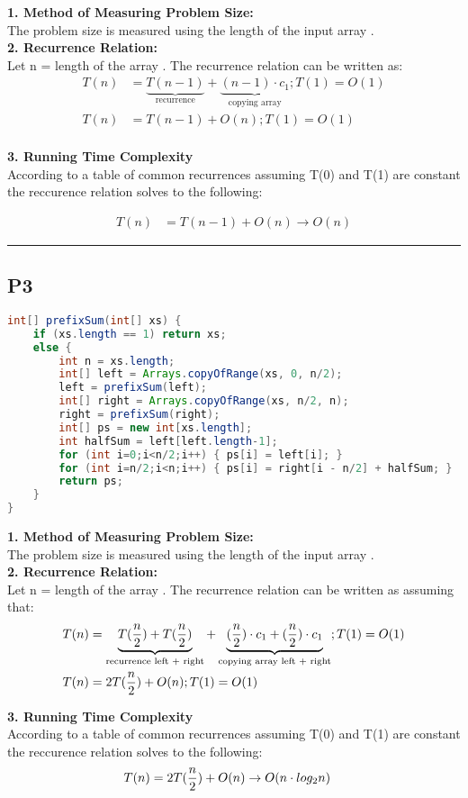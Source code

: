 \textbf{1. Method of Measuring Problem Size:}\\ 
The problem size is measured using the length of the input array .
\\
    
\textbf{2. Recurrence Relation:}\\ 
Let n = length of the array . The recurrence relation can be written as:
\begin{align*}
 T(n) &=  \underbrace{T({n-1})}_{\text{recurrence}} +
\underbrace{({n - 1})\cdot c_1}_{\text{copying array}}
; T(1) = O(1)\\
T(n) &=  T({n-1}) +O(n)
 ; T(1) = O(1)\\
\end{align*}

\textbf{3. Running Time Complexity}\\ 
According to a table of common recurrences assuming T(0) and T(1) are constant the reccurence relation solves to the following:

\begin{align*}
    T(n) &=  T({n-1}) +O(n) \rightarrow O(n) 
\end{align*}


\hrule

\subsection*{P3}
\begin{lstlisting}[language=Java]
int[] prefixSum(int[] xs) {
    if (xs.length == 1) return xs;
    else {
        int n = xs.length;
        int[] left = Arrays.copyOfRange(xs, 0, n/2);
        left = prefixSum(left);
        int[] right = Arrays.copyOfRange(xs, n/2, n);
        right = prefixSum(right);
        int[] ps = new int[xs.length];
        int halfSum = left[left.length-1];
        for (int i=0;i<n/2;i++) { ps[i] = left[i]; }
        for (int i=n/2;i<n;i++) { ps[i] = right[i - n/2] + halfSum; }
        return ps;
    }
}
\end{lstlisting}

\textbf{1. Method of Measuring Problem Size:}\\ 
The problem size is measured using the length of the input array .
\\
    
\textbf{2. Recurrence Relation:}\\ 
Let n = length of the array . The recurrence relation can be written as assuming that:
\begin{align*}
 T(n) &=  \underbrace{T({n\over2})+T({n\over2})}_{\text{recurrence left + right}} +
\underbrace{({n\over2})\cdot c_1+({n\over2})\cdot c_1}_{\text{copying array left + right}}
; T(1) = O(1)\\
T(n) &=  2T({n\over2})+O(n)
 ; T(1) = O(1)\\
\end{align*}

\textbf{3. Running Time Complexity}\\ 
According to a table of common recurrences assuming T(0) and T(1) are constant the reccurence relation solves to the following:
\begin{align*}
   T(n) &=  2T({n\over2})+O(n) \rightarrow O(n \cdot log_2n)
   \end{align*}


